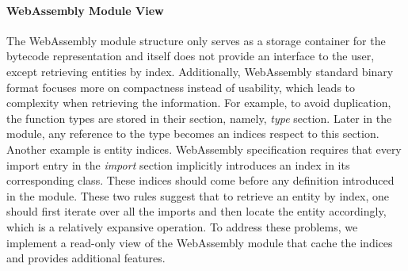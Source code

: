 \paragraph{WebAssembly Module View}
The WebAssembly module structure only serves as a storage container for the bytecode representation and itself does not provide an interface to the user, except retrieving entities by index. Additionally, WebAssembly standard binary format focuses more on compactness instead of usability, which leads to complexity when retrieving the information. For example, to avoid duplication, the function types are stored in their section, namely, \emph{type} section. Later in the module, any reference to the type becomes an indices respect to this section. Another example is entity indices. WebAssembly specification requires that every import entry in the \emph{import} section implicitly introduces an index in its corresponding class. These indices should come before any definition introduced in the module. These two rules suggest that to retrieve an entity by index, one should first iterate over all the imports and then locate the entity accordingly, which is a relatively expansive operation. To address these problems, we implement a read-only view of the WebAssembly module that cache the indices and provides additional features.

